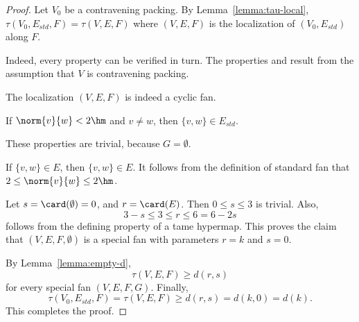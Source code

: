 \begin{proof}
  Let $V_0$ be a contravening packing.  By
  Lemma~\ref{lemma:tau-local}, $\tau(V_0,E_{std},F)=\tau(V,E,F)$ where
  $(V,E,F)$ is the localization of $(V_0,E_{std})$ along $F$.

    Indeed,
  every property can be verified in turn.  The properties
   and  result from the assumption that
  $V$ is contravening packing.

  The localization $(V,E,F)$ is indeed a cyclic fan.

 If $\norm{v}{w}<2\hm$ and $v\ne w$, then $\{v,w\}\in
E_{std}$.

  These properties are trivial, because
$G=\emptyset$.

 If $\{v,w\}\in E$, then $\{v,w\}\in E$.  It follows from
the definition of standard fan that $2\le \norm{v}{w}\le 2\hm$.

 Let $s=\card(\emptyset) = 0$, and $r=\card(E)$.  Then
$0\le s\le 3$ is trivial. Also,
\begin{displaymath}3-s \le 3\le r \le 6=6 - 2s\end{displaymath}
follows from the defining property  of a tame
hypermap.  This proves the claim that $(V,E,F,\emptyset)$ is a special
fan with parameters $r=k$ and $s=0$.

By Lemma~\ref{lemma:empty-d}, 
\begin{displaymath}
\tau(V,E,F) \ge d (r,s)
\end{displaymath}
for every special fan $(V,E,F,G)$. 
Finally, 
\begin{displaymath}
\tau(V_0,E_{std},F)=\tau(V,E,F) \ge d(r,s) = d(k,0) = d(k).
\end{displaymath}  
This completes the proof.
\end{proof}


